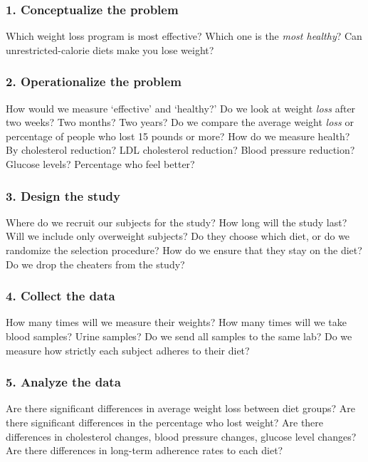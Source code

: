 \documentclass[11pt, chapterprefix=true]{scrbook}\usepackage[]{graphicx}\usepackage[]{color}
\begin{document}
\subsubsection{1.	Conceptualize the problem}

Which weight loss program is most effective?   Which one is the \textit{most healthy}?   Can \\ unrestricted-calorie diets make you lose weight?

\subsubsection{2.	Operationalize the problem}

How would we measure `effective' and `healthy?'  Do we look at weight \textit{loss} after two weeks? Two months?  Two years?  Do we compare the average weight \textit{loss} or percentage of people who lost 15 pounds or more?  How do we measure health?  By cholesterol reduction?  LDL cholesterol reduction?  Blood pressure reduction?  Glucose levels?  Percentage who feel better?

\subsubsection{3.	Design the study}

Where do we recruit our subjects for the study? How long will the study last?  Will we include only overweight subjects?  Do they choose which diet, or do we randomize the selection procedure?  How do we ensure that they stay on the diet?  Do we drop the cheaters from the study?

\subsubsection{4.	Collect the data}

How many times will we measure their weights?  How many times will we take blood samples?  Urine samples?  Do we send all samples to the same lab?  Do we measure how strictly each subject adheres to their diet?

\subsubsection{5.	Analyze the data}

Are there significant differences in average weight loss between diet groups?  Are there significant differences in the percentage who lost weight?  Are there differences in cholesterol changes, blood pressure changes, glucose level changes?  Are there differences in long-term adherence rates to each diet?
\end{document}
